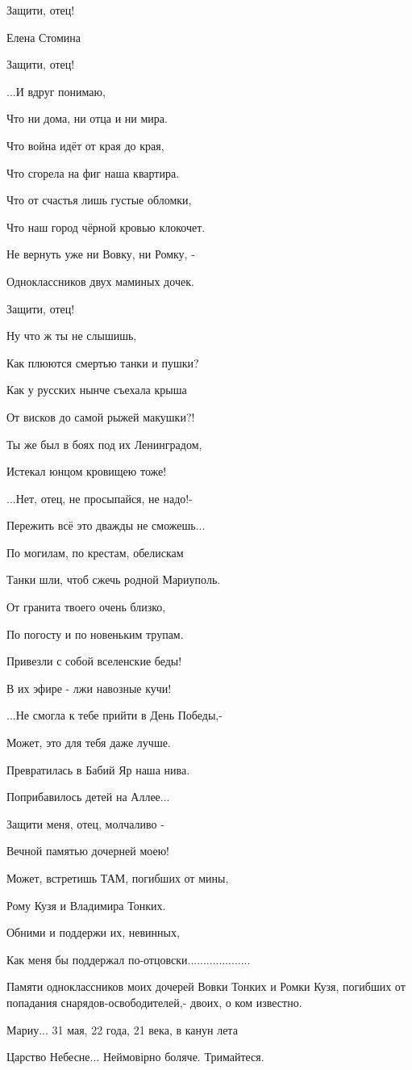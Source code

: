 Защити, отец!\par
Елена Стомина\par
Защити, отец!\par
...И вдруг понимаю,\par
Что ни дома, ни отца и ни мира.\par
Что война идёт от края до края,\par
Что сгорела на фиг наша квартира.\par
Что от счастья лишь густые обломки,\par
Что наш город чёрной кровью клокочет.\par
Не вернуть уже ни Вовку, ни Ромку, -\par
Одноклассников двух маминых дочек.\par
Защити, отец!\par
Ну что ж ты не слышишь,\par
Как плюются смертью танки и пушки?\par
Как у русских нынче съехала крыша\par
От висков до самой рыжей макушки?!\par
Ты же был в боях под их Ленинградом,\par
Истекал юнцом кровищею тоже!\par
...Нет, отец, не просыпайся, не надо!-\par
Пережить всё это дважды не сможешь...\par
По могилам, по крестам, обелискам\par
Танки шли, чтоб сжечь родной Мариуполь.\par
От гранита твоего очень близко,\par
По погосту и по новеньким трупам.\par
Привезли с собой вселенские беды!\par
В их эфире - лжи навозные кучи!\par
...Не смогла к тебе прийти в День Победы,-\par
Может, это для тебя даже лучше.\par
Превратилась в Бабий Яр наша нива.\par
Поприбавилось детей на Аллее...\par
Защити меня, отец, молчаливо -\par
Вечной памятью дочерней моею!\par
Может, встретишь ТАМ, погибших от мины,\par
Рому Кузя и Владимира Тонких.\par
Обними и поддержи их, невинных,\par
Как меня бы поддержал по-отцовски....................\par
Памяти одноклассников моих дочерей Вовки Тонких и Ромки Кузя, погибших от попадания снарядов-освободителей,- двоих, о ком известно.\par
Мариу... 31 мая, 22 года, 21 века, в канун лета\par


Царство Небесне... Неймовірно боляче. Тримайтеся.
